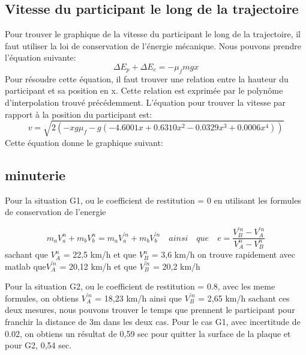 \documentclass{article}
\begin{document}
\subsection{Vitesse du participant le long de la trajectoire}
Pour trouver le graphique de la vitesse du participant le long de la trajectoire, il faut utiliser la loi de conservation de l'énergie mécanique. Nous pouvons prendre l'équation suivante:
\begin{equation}
	\Delta E_p + \Delta E_c = -\mu_fmgx
\end{equation}
Pour résoudre cette équation, il faut trouver une relation entre la hauteur du participant et sa position en x. Cette relation est exprimée par le polynôme d'interpolation trouvé précédemment. L'équation pour trouver la vitesse par rapport à la position du participant est:
\begin{equation}
	v = \sqrt{2(-xg\mu_f-g(-4.6001x+0.6310x^2-0.0329x^3+0.0006x^4))}
\end{equation}
Cette équation donne le graphique suivant:
\begin{center}
\end{center}

 
 \subsection{minuterie}
 Pour la situation G1, ou le coefficient de restitution = 0
 en utilisant les formules de conservation de l'energie 
 
 \begin{equation}
 m_{a}V_{a}^{n} + m_{b}V_{b}^{n} = m_{a}V_{a}^{'n} + m_{b}V_{b}^{'n}  \quad ainsi \quad que \quad e = \frac {V_{B}^{'n}-V_{A}^{'n}}{V_{A}^{n}-V_{B}^{n}} 
 \end{equation}
 sachant que $ V_{A}^{n}$ = 22,5 km/h et que $V_{B}^{n}$ = 3,6 km/h on trouve rapidement avec matlab que$ V_{A}^{'n}$ = 20,12 km/h et que $V_{B}^{'n}$ = 20,2 km/h 
 
\vspace*{4mm}
 Pour la situation G2, ou le coefficient de restitution = 0.8, avec les meme formules, on obtiens $ V_{A}^{'n}$ = 18,23 km/h ainsi que $V_{B}^{'n}$ = 2,65 km/h  sachant ces deux mesures, nous pouvons trouver le temps que prennent le participant pour franchir la distance de 3m dans les deux cas. Pour le cas G1, avec incertitude de 0.02, on obtiens un résultat de 0,59 sec pour quitter la surface de la plaque et pour G2, 0,54 sec.
 
\end{document}
